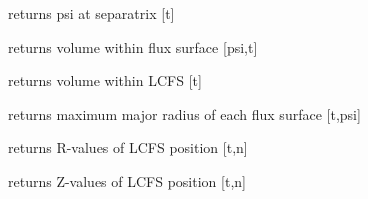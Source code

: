 \documentclass[letterpaper,10pt,english]{sphinxmanual}
\begin{document}
\begin{fulllineitems}

\begin{fulllineitems}
\label{eqtools:eqtools.EFIT.EFITTree.getFluxLCFS}
returns psi at separatrix {[}t{]}

\end{fulllineitems}


\begin{fulllineitems}
\label{eqtools:eqtools.EFIT.EFITTree.getFluxVol}
returns volume within flux surface {[}psi,t{]}

\end{fulllineitems}


\begin{fulllineitems}
\label{eqtools:eqtools.EFIT.EFITTree.getVolLCFS}
returns volume within LCFS {[}t{]}

\end{fulllineitems}


\begin{fulllineitems}
\label{eqtools:eqtools.EFIT.EFITTree.getRmidPsi}
returns maximum major radius of each flux surface {[}t,psi{]}

\end{fulllineitems}


\begin{fulllineitems}
\label{eqtools:eqtools.EFIT.EFITTree.getRLCFS}
returns R-values of LCFS position {[}t,n{]}

\end{fulllineitems}


\begin{fulllineitems}
\label{eqtools:eqtools.EFIT.EFITTree.getZLCFS}
returns Z-values of LCFS position {[}t,n{]}


\end{fulllineitems}
\end{fulllineitems}
\end{document}
